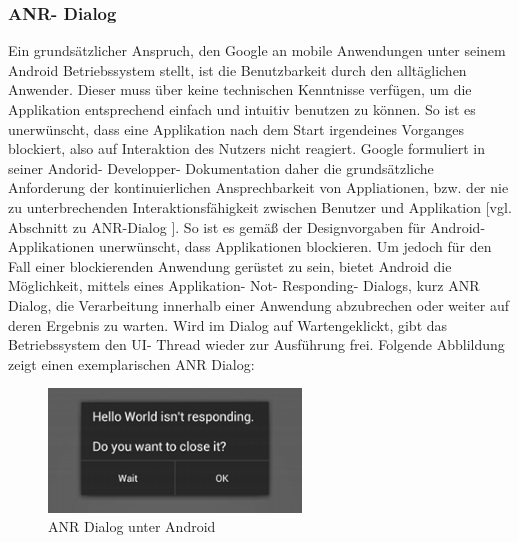 \documentclass[12pt,oneside,a4paper,bibtotoc,liststotoc]{scrreprt}
\begin{document}
\subsubsection{ANR- Dialog}
Ein grundsätzlicher Anspruch, den Google an mobile Anwendungen unter seinem Android Betriebssystem stellt, ist die Benutzbarkeit durch den alltäglichen Anwender. Dieser muss über keine technischen Kenntnisse verfügen, um die Applikation entsprechend einfach und intuitiv benutzen zu können. So ist es unerwünscht, dass eine Applikation nach dem Start irgendeines Vorganges blockiert, also auf Interaktion des Nutzers nicht reagiert. Google formuliert in seiner Andorid- Developper- Dokumentation daher die grundsätzliche Anforderung der kontinuierlichen Ansprechbarkeit von Appliationen, bzw. der nie zu unterbrechenden Interaktionsfähigkeit zwischen Benutzer und Applikation [vgl. Abschnitt zu ANR-Dialog \citet{androidDevDocu}]. So ist es gemäß der Designvorgaben für Android- Applikationen unerwünscht, dass Applikationen blockieren. Um jedoch für den Fall einer blockierenden Anwendung gerüstet zu sein, bietet Android die Möglichkeit, mittels eines Applikation- Not- Responding- Dialogs, kurz ANR Dialog, die Verarbeitung innerhalb einer Anwendung abzubrechen oder weiter auf deren Ergebnis zu warten. Wird im Dialog auf \glqq Warten\grqq geklickt, gibt das Betriebssystem den UI- Thread wieder zur Ausführung frei. Folgende Abblildung zeigt einen exemplarischen ANR Dialog:
\begin{figure}[H]
  \begin{centering}
    \includegraphics[width=0.6\textwidth]{img/anr-dialog.png}
    \caption{ANR Dialog unter Android}
    \label{ANR Dialog}
  \end{centering}
\end{figure}
\end{document}

